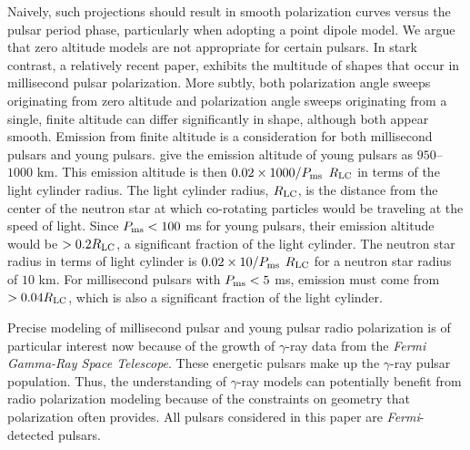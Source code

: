 Naively, such projections should result in smooth polarization curves 
versus the pulsar period phase, particularly when adopting a point dipole model.
We argue that zero altitude models are not appropriate for certain pulsars. 
In stark contrast, a relatively recent paper, \cite{yan2011polarization} exhibits 
the multitude of shapes that occur in millisecond pulsar polarization. 
More subtly, both polarization angle sweeps originating from zero altitude and 
polarization angle sweeps originating from a single, finite altitude can 
differ significantly in shape, although both appear smooth.  
Emission from finite altitude is a consideration for both millisecond pulsars and young pulsars.
\cite{karastergiou2007empirical} give the emission altitude of young pulsars
as $950$--$1000$ km. This emission altitude is then 
$0.02 \times 1000 / P_{\rm{ms}}$ $R_{\rm{LC}}$ in terms of the light cylinder radius.
The light cylinder radius, $R_{\rm{LC}}$, is the distance from the center of 
the neutron star at which co-rotating particles would be traveling
at the speed of light.
Since  $P_{\rm{ms}} < 100$ ms for young pulsars, their emission altitude would
be $> 0.2 R_{\rm{LC}}$, a significant fraction of the light cylinder. 
The neutron star radius in terms of light cylinder is $0.02 \times 10 / P_{\rm{ms}}$ $R_{\rm{LC}}$ 
for a neutron star radius of $10$ km.  For millisecond pulsars
with $P_{\rm{ms}} < 5$ ms, emission must come from $>0.04 R_{\rm{LC}}$, 
which is also a significant fraction of the light cylinder.

Precise modeling of millisecond pulsar and young pulsar radio 
polarization is of particular interest now because of the 
growth of $\gamma$-ray data from the \textit{Fermi Gamma-Ray Space Telescope}. 
These energetic pulsars make up the $\gamma$-ray pulsar population.
Thus, the understanding of $\gamma$-ray models can potentially 
benefit from radio polarization modeling because 
of the constraints on geometry that polarization often provides.
All pulsars considered in this paper are \textit{Fermi}-detected pulsars.

